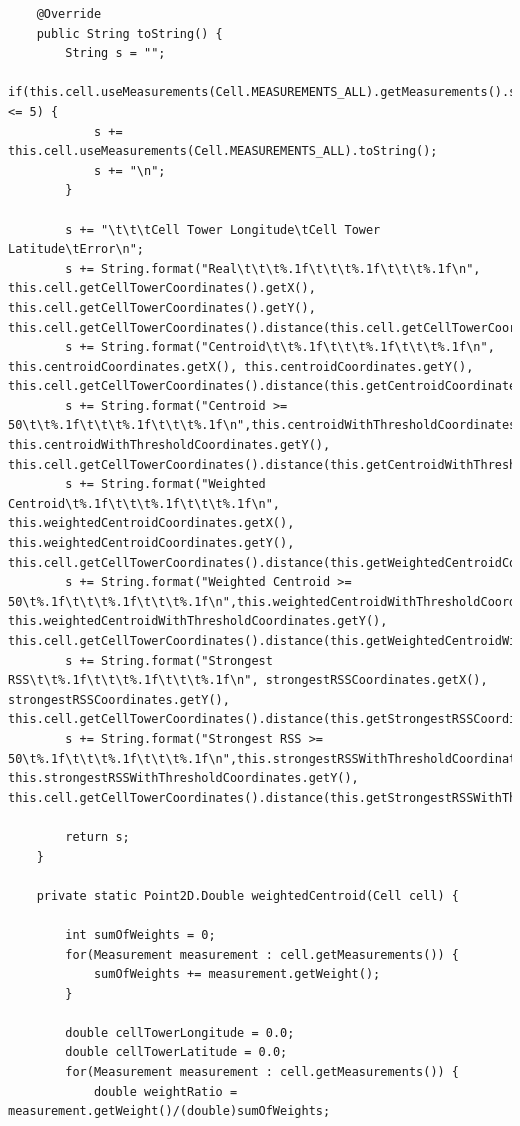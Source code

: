 \documentclass[a4paper, 12pt]{article}
\begin{document}
\begin{lstlisting}
	@Override
	public String toString() {
		String s = "";
		if(this.cell.useMeasurements(Cell.MEASUREMENTS_ALL).getMeasurements().size() <= 5) {
			s += this.cell.useMeasurements(Cell.MEASUREMENTS_ALL).toString();
			s += "\n";
		}
		
		s += "\t\t\tCell Tower Longitude\tCell Tower Latitude\tError\n";
		s += String.format("Real\t\t\t%.1f\t\t\t%.1f\t\t\t%.1f\n", this.cell.getCellTowerCoordinates().getX(), this.cell.getCellTowerCoordinates().getY(), this.cell.getCellTowerCoordinates().distance(this.cell.getCellTowerCoordinates()));
		s += String.format("Centroid\t\t%.1f\t\t\t%.1f\t\t\t%.1f\n", this.centroidCoordinates.getX(), this.centroidCoordinates.getY(), this.cell.getCellTowerCoordinates().distance(this.getCentroidCoordinates()));
		s += String.format("Centroid >= 50\t\t%.1f\t\t\t%.1f\t\t\t%.1f\n",this.centroidWithThresholdCoordinates.getX(), this.centroidWithThresholdCoordinates.getY(), this.cell.getCellTowerCoordinates().distance(this.getCentroidWithThresholdCoordinates()));
		s += String.format("Weighted Centroid\t%.1f\t\t\t%.1f\t\t\t%.1f\n", this.weightedCentroidCoordinates.getX(), this.weightedCentroidCoordinates.getY(), this.cell.getCellTowerCoordinates().distance(this.getWeightedCentroidCoordinates()));
		s += String.format("Weighted Centroid >= 50\t%.1f\t\t\t%.1f\t\t\t%.1f\n",this.weightedCentroidWithThresholdCoordinates.getX(), this.weightedCentroidWithThresholdCoordinates.getY(), this.cell.getCellTowerCoordinates().distance(this.getWeightedCentroidWithThresholdCoordinates()));
		s += String.format("Strongest RSS\t\t%.1f\t\t\t%.1f\t\t\t%.1f\n", strongestRSSCoordinates.getX(), strongestRSSCoordinates.getY(), this.cell.getCellTowerCoordinates().distance(this.getStrongestRSSCoordinates()));
		s += String.format("Strongest RSS >= 50\t%.1f\t\t\t%.1f\t\t\t%.1f\n",this.strongestRSSWithThresholdCoordinates.getX(), this.strongestRSSWithThresholdCoordinates.getY(), this.cell.getCellTowerCoordinates().distance(this.getStrongestRSSWithThresholdCoordinates()));

		return s;
	}
	
	private static Point2D.Double weightedCentroid(Cell cell) {
		
		int sumOfWeights = 0;
		for(Measurement measurement : cell.getMeasurements()) {
			sumOfWeights += measurement.getWeight();
		}
				
		double cellTowerLongitude = 0.0;
		double cellTowerLatitude = 0.0;
		for(Measurement measurement : cell.getMeasurements()) {
			double weightRatio = measurement.getWeight()/(double)sumOfWeights;


\end{lstlisting}
\end{document}
